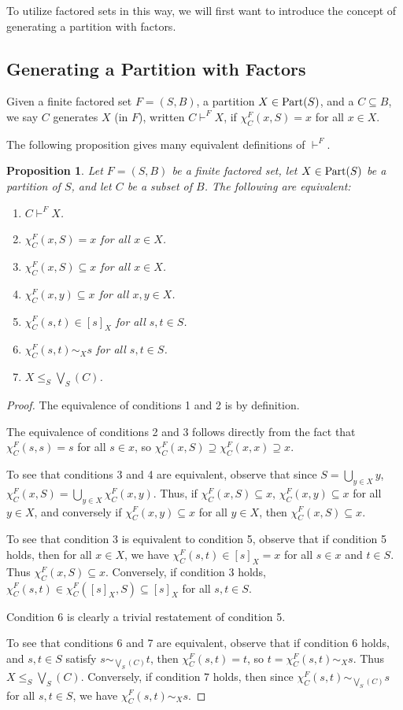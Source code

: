 \documentclass[authordate,onecolumn]{miri-tech-article}
\newtheorem{proposition}{Proposition}
\begin{document}
To utilize factored sets in this way, we will first want to introduce the concept of generating a partition with factors.
\subsection{Generating a Partition with Factors}
\begin{definition}\label{templabel9}
Given a finite factored set $F=(S,B)$, a partition $X\in \text{Part}(S)$, and a $C\subseteq B$, we say $C$ generates $X$ (in $F$), written $C\vdash^F X$, if $\chi^F_C(x,S)=x$ for all $x\in X$.
\end{definition}
The following proposition gives many equivalent definitions of $\vdash^F$.
\begin{proposition}\label{equivgen}
Let $F=(S,B)$ be a finite factored set, let $X\in \text{Part}(S)$ be a partition of $S$, and let $C$ be a subset of $B$. The following are equivalent:
\begin{enumerate}
    \item $C\vdash^F X$.
    \item $\chi^F_C(x,S)=x$ for all $x\in X$.
    \item $\chi^F_C(x,S)\subseteq x$ for all $x\in X$.
    \item $\chi^F_C(x,y)\subseteq x$ for all $x,y\in X$.
    \item $\chi^F_C(s,t) \in [s]_X$ for all $s,t\in S$.
    \item $\chi^F_C(s,t)\sim_X s$ for all $s,t\in S$.
    \item $X\leq_S\bigvee_S(C)$.
\end{enumerate}
\end{proposition}
\begin{proof}
The equivalence of conditions 1 and 2 is by definition.

The equivalence of conditions 2 and 3 follows directly from the fact that $\chi^F_C(s,s)=s$ for all $s\in x$, so $\chi^F_C(x,S)\supseteq \chi^F_C(x,x)\supseteq x$.

To see that conditions 3 and 4 are equivalent, observe that since $S=\bigcup_{y\in X} y$, $\chi^F_C(x,S)=\bigcup_{y\in X}\chi^F_C(x,y)$. Thus, if $\chi^F_C(x,S)\subseteq x$, $\chi^F_C(x,y)\subseteq x$ for all $y\in X$, and conversely if $\chi^F_C(x,y)\subseteq x$ for all $y\in X$, then $\chi^F_C(x,S)\subseteq x$.

To see that condition 3 is equivalent to condition 5, observe that if condition 5 holds, then for all $x\in X$, we have $\chi^F_C(s,t)\in [s]_X=x$ for all $s\in x$ and  $t\in S$. Thus $\chi^F_C(x,S)\subseteq x$. Conversely, if condition 3 holds, $\chi^F_C(s,t)\in \chi^F_C([s]_X,S)\subseteq [s]_X$ for all $s,t\in S$.

Condition 6 is clearly a trivial restatement of condition 5.

To see that conditions 6 and 7 are equivalent, observe that if condition 6 holds, and $s,t\in S$ satisfy $s\sim_{\bigvee_S(C)}t$, then $\chi^F_C(s,t)=t$, so $t=\chi^F_C(s,t)\sim_X s$. Thus $X\leq_S\bigvee_S(C)$. Conversely, if condition 7 holds, then since $\chi^F_C(s,t)\sim_{\bigvee_S(C)} s$ for all $s,t\in S$, we have $\chi^F_C(s,t)\sim_{X} s$.
\end{proof}
\end{document}
